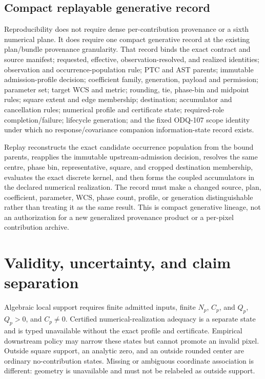 \documentclass[11pt]{article}
\begin{document}
\subsection{Compact replayable generative record}
\label{sec:replay-record}

Reproducibility does not require dense per-contribution provenance or a sixth
numerical plane.  It does require one compact generative record at the
existing plan/bundle provenance granularity.  That record binds the exact
contract and source manifest; requested, effective, observation-resolved, and
realized identities; observation and occurrence-population rule; PTC and AST
parents; immutable admission-profile decision; coefficient family,
generation, payload and permission; parameter set; target WCS and metric;
rounding, tie, phase-bin and midpoint rules; square extent and edge membership;
destination; accumulator and cancellation rules; numerical profile and
certificate state; required-role completion/failure; lifecycle generation;
and the fixed ODQ-107 scope identity under which no response/covariance
companion information-state record exists.

Replay reconstructs the exact candidate occurrence population from the bound
parents, reapplies the immutable upstream-admission decision, resolves the
same centre, phase bin, representative, square, and cropped destination
membership, evaluates the exact discrete kernel, and then forms the coupled
accumulators in the declared numerical realization.  The record must make a
changed source, plan, coefficient, parameter, WCS, phase count, profile, or
generation distinguishable rather than treating it as the same result.  This
is compact generative lineage, not an authorization for a new generalized
provenance product or a per-pixel contribution archive.

\section{Validity, uncertainty, and claim separation}
\label{sec:validity-narrative}

Algebraic local support requires finite admitted inputs, finite $N_p$, $C_p$,
and $Q_p$, $Q_p>0$, and $C_p\ne0$.  Certified numerical-realization adequacy
is a separate state and is typed unavailable without the exact profile and
certificate.  Empirical downstream policy may narrow these states but cannot
promote an invalid pixel.  Outside square support, an analytic zero, and an
outside rounded center are ordinary no-contribution states.  Missing or
ambiguous coordinate association is different: geometry is unavailable and
must not be relabeled as outside support.
\end{document}
